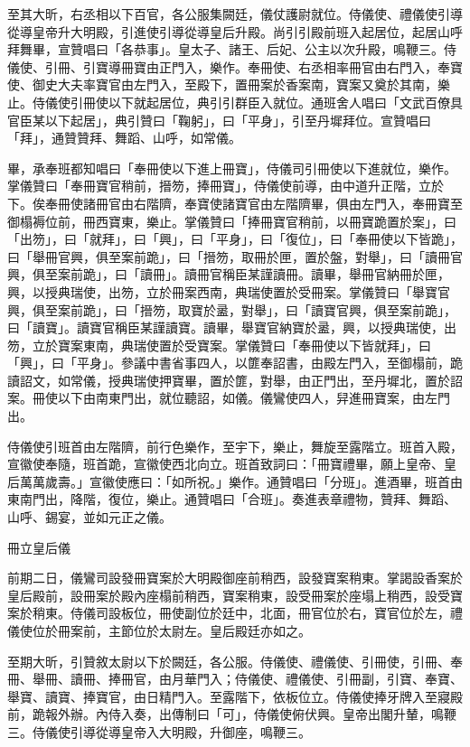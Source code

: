 \begin{pinyinscope}
 至其大昕，右丞相以下百官，各公服集闕廷，儀仗護尉就位。侍儀使、禮儀使引導從導皇帝升大明殿，引進使引導從導皇后升殿。尚引引殿前班入起居位，起居山呼拜舞畢，宣贊唱曰「各恭事」。皇太子、諸王、后妃、公主以次升殿，鳴鞭三。侍儀使、引冊、引寶導冊寶由正門入，樂作。奉冊使、右丞相率冊官由右門入，奉寶使、御史大夫率寶官由左門入，至殿下，置冊案於香案南，寶案又奠於其南，樂止。侍儀使引冊使以下就起居位，典引引群臣入就位。通班舍人唱曰「文武百僚具官臣某以下起居」，典引贊曰「鞠躬」，曰「平身」，引至丹墀拜位。宣贊唱曰「拜」，通贊贊拜、舞蹈、山呼，如常儀。



 畢，承奉班都知唱曰「奉冊使以下進上冊寶」，侍儀司引冊使以下進就位，樂作。掌儀贊曰「奉冊寶官稍前，搢笏，捧冊寶」，侍儀使前導，由中道升正階，立於下。俟奉冊使諸冊官由右階隮，奉寶使諸寶官由左階隮畢，俱由左門入，奉冊寶至御榻褥位前，冊西寶東，樂止。掌儀贊曰「捧冊寶官稍前，以冊寶跪置於案」，曰「出笏」，曰「就拜」，曰「興」，曰「平身」，曰「復位」，曰「奉冊使以下皆跪」，曰「舉冊官興，俱至案前跪」，曰「搢笏，取冊於匣，置於盤，對舉」，曰「讀冊官興，俱至案前跪」，曰「讀冊」。讀冊官稱臣某謹讀冊。讀畢，舉冊官納冊於匣，興，以授典瑞使，出笏，立於冊案西南，典瑞使置於受冊案。掌儀贊曰「舉寶官興，俱至案前跪」，曰「搢笏，取寶於盝，對舉」，曰「讀寶官興，俱至案前跪」，曰「讀寶」。讀寶官稱臣某謹讀寶。讀畢，舉寶官納寶於盝，興，以授典瑞使，出笏，立於寶案東南，典瑞使置於受寶案。掌儀贊曰「奉冊使以下皆就拜」，曰「興」，曰「平身」。參議中書省事四人，以篚奉詔書，由殿左門入，至御榻前，跪讀詔文，如常儀，授典瑞使押寶畢，置於篚，對舉，由正門出，至丹墀北，置於詔案。冊使以下由南東門出，就位聽詔，如儀。儀鸞使四人，舁進冊寶案，由左門出。



 侍儀使引班首由左階隮，前行色樂作，至宇下，樂止，舞旋至露階立。班首入殿，宣徽使奉隨，班首跪，宣徽使西北向立。班首致詞曰：「冊寶禮畢，願上皇帝、皇后萬萬歲壽。」宣徽使應曰：「如所祝。」樂作。通贊唱曰「分班」。進酒畢，班首由東南門出，降階，復位，樂止。通贊唱曰「合班」。奏進表章禮物，贊拜、舞蹈、山呼、錫宴，並如元正之儀。



 冊立皇后儀



 前期二日，儀鸞司設發冊寶案於大明殿御座前稍西，設發寶案稍東。掌謁設香案於皇后殿前，設冊案於殿內座榻前稍西，寶案稍東，設受冊案於座塌上稍西，設受寶案於稍東。侍儀司設板位，冊使副位於廷中，北面，冊官位於右，寶官位於左，禮儀使位於冊案前，主節位於太尉左。皇后殿廷亦如之。



 至期大昕，引贊敘太尉以下於闕廷，各公服。侍儀使、禮儀使、引冊使，引冊、奉冊、舉冊、讀冊、捧冊官，由月華門入；侍儀使、禮儀使、引冊副，引寶、奉寶、舉寶、讀寶、捧寶官，由日精門入。至露階下，依板位立。侍儀使捧牙牌入至寢殿前，跪報外辦。內侍入奏，出傳制曰「可」，侍儀使俯伏興。皇帝出閣升輦，鳴鞭三。侍儀使引導從導皇帝入大明殿，升御座，鳴鞭三。




\end{pinyinscope}
